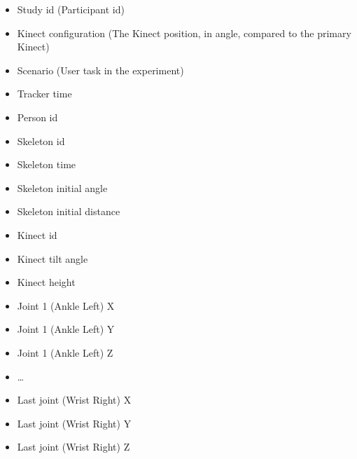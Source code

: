 \begin{itemize}
  \item Study id (Participant id)
  \item Kinect configuration (The Kinect position, in angle, compared to the primary Kinect)
  \item Scenario (User task in the experiment)
  \item Tracker time
  \item Person id
  \item Skeleton id
  \item Skeleton time
  \item Skeleton initial angle
  \item Skeleton initial distance
  \item Kinect id
  \item Kinect tilt angle
  \item Kinect height
  \item Joint 1 (Ankle Left) X
  \item Joint 1 (Ankle Left) Y
  \item Joint 1 (Ankle Left) Z
  \item \ldots
  \item Last joint (Wrist Right) X
  \item Last joint (Wrist Right) Y 
  \item Last joint (Wrist Right) Z
\end{itemize}



